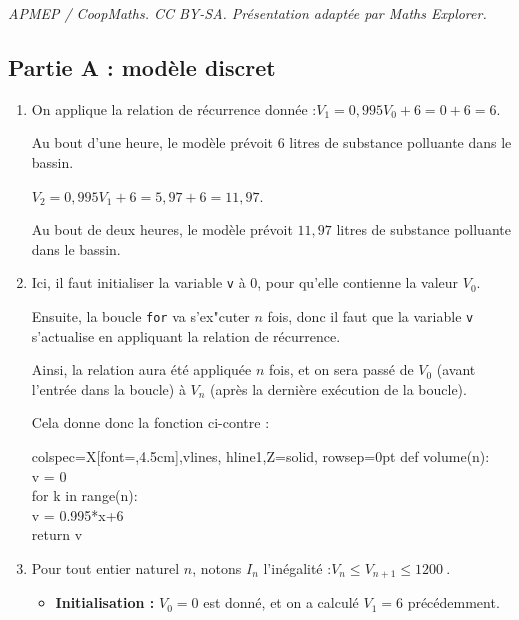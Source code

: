 \documentclass[10pt]{article}
\providecommand{\blue}{\color{blue}}
\providecommand{\np}[2][]{{#2~#1}}
\providecommand{\blue}{\color{blue}}
\begin{document}
\noindent\textit{APMEP / CoopMaths. CC BY-SA. Présentation adaptée par Maths Explorer.}\par\medskip
\subsection*{Partie A : modèle discret}
\begin{enumerate}
	\item On applique la relation de récurrence donnée :\quad $V_1 = 0,995V_0 + 6 = 0 +6 = 6 $.

	Au bout d'une heure, le modèle prévoit 6 litres de substance polluante dans le bassin.

	$V_2 = 0,995V_1 + 6 = 5,97 + 6 = 11,97$.

	Au bout de deux heures, le modèle prévoit $11,97$ litres de substance polluante dans le bassin.

	\item Ici, il faut initialiser la variable \texttt{v} à 0, pour qu'elle contienne la valeur $V_0$.

	Ensuite, la boucle \texttt{for} va s'ex"cuter $n$ fois, donc il faut que la variable \texttt{v} s'actualise en appliquant la relation de récurrence.

	\begin{minipage}[t]{0.6\linewidth}


	Ainsi, la relation aura été appliquée $n$ fois, et on sera passé de $V_0$ (avant l'entrée dans la boucle) à $V_n$ (après la dernière exécution de la boucle).

	Cela donne donc la fonction ci-contre :
	\end{minipage}
	\hfill
		\begin{tblr}[T]{colspec={X[font=\ttfamily,4.5cm]},vlines, hline{1,Z}={solid}, rowsep=0pt}
			def volume(n):\\
			\quad v = {\blue 0}\\
			\quad for k in range(n):\\
			\quad \quad	v = {\blue 0.995*x+6}\\
			\quad return v\\
		\end{tblr}

	\item Pour tout entier naturel $n$, notons $I_n$ l'inégalité :\quad $V_n \leqslant V_{n+1} \leqslant \np{1200}$.

	\begin{itemize}
		\item \textbf{Initialisation :} $V_0 = 0$ est donné, et on a calculé $V_1 = 6$  précédemment.


\end{itemize}
\end{enumerate}
\end{document}

